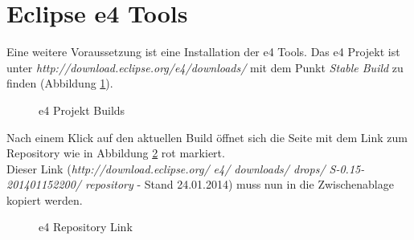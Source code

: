 \section{Eclipse e4 Tools}
Eine weitere Voraussetzung ist eine Installation der e4 Tools. Das e4 Projekt ist unter \textit{http://download.eclipse.org/e4/downloads/} mit dem Punkt \textit{Stable Build} zu finden (Abbildung \ref{e4download}). 

\begin{figure}[H]
  \vspace{0.5cm}
  \centering
  \caption{e4 Projekt Builds}
  \label{e4download}
  \vspace{0.5cm}
\end{figure}

Nach einem Klick auf den aktuellen Build öffnet sich die Seite mit dem Link zum Repository wie in Abbildung \ref{repolink} rot markiert.\\
Dieser Link (\textit{http://download.eclipse.org/ e4/ downloads/ drops/ S-0.15-201401152200/ repository} - Stand 24.01.2014) muss nun in die Zwischenablage kopiert werden.

\begin{figure}[H]
  \vspace{0.5cm}
  \centering
  \caption{e4 Repository Link}
  \label{repolink}
  \vspace{0.5cm}
\end{figure}


